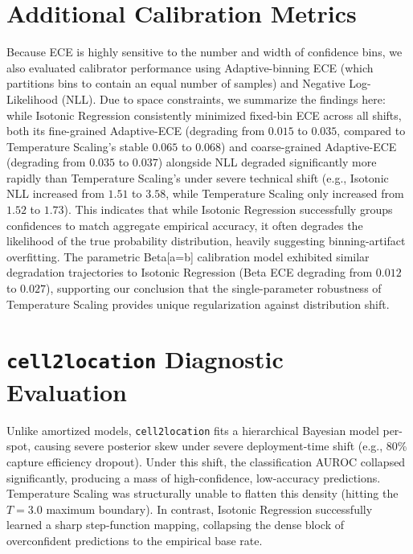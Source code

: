 \documentclass{jmlr} %
\begin{document}
\section{Additional Calibration Metrics}
\label{app:additional_metrics}
Because ECE is highly sensitive to the number and width of confidence bins, we also evaluated calibrator performance using Adaptive-binning ECE (which partitions bins to contain an equal number of samples) and Negative Log-Likelihood (NLL). Due to space constraints, we summarize the findings here: while Isotonic Regression consistently minimized fixed-bin ECE across all shifts, both its fine-grained Adaptive-ECE (degrading from $0.015$ to $0.035$, compared to Temperature Scaling's stable $0.065$ to $0.068$) and coarse-grained Adaptive-ECE (degrading from $0.035$ to $0.037$) alongside NLL degraded significantly more rapidly than Temperature Scaling's under severe technical shift (e.g., Isotonic NLL increased from $1.51$ to $3.58$, while Temperature Scaling only increased from $1.52$ to $1.73$). This indicates that while Isotonic Regression successfully groups confidences to match aggregate empirical accuracy, it often degrades the likelihood of the true probability distribution, heavily suggesting binning-artifact overfitting. The parametric Beta[a=b] calibration model exhibited similar degradation trajectories to Isotonic Regression (Beta ECE degrading from $0.012$ to $0.027$), supporting our conclusion that the single-parameter robustness of Temperature Scaling provides unique regularization against distribution shift.

\section{\texttt{cell2location} Diagnostic Evaluation}
\label{app:c2l_diagnostic}
Unlike amortized models, \texttt{cell2location} fits a hierarchical Bayesian model per-spot, causing severe posterior skew under severe deployment-time shift (e.g., 80\% capture efficiency dropout). Under this shift, the classification AUROC collapsed significantly, producing a mass of high-confidence, low-accuracy predictions. Temperature Scaling was structurally unable to flatten this density (hitting the $T=3.0$ maximum boundary). In contrast, Isotonic Regression successfully learned a sharp step-function mapping, collapsing the dense block of overconfident predictions to the empirical base rate.
\end{document}
